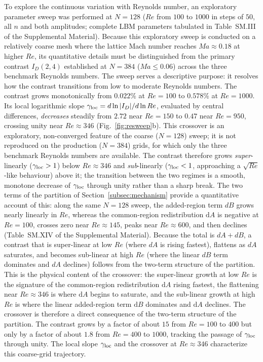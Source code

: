 To explore the continuous variation with Reynolds number, an exploratory parameter sweep was performed at $N=128$ ($Re$ from $100$ to $1000$ in steps of $50$, all $n$ and both amplitudes; complete LBM parameters tabulated in Table~SM.III of the Supplemental Material). Because this exploratory sweep is conducted on a relatively coarse mesh where the lattice Mach number reaches $Ma\approx0.18$ at higher $Re$, its quantitative details must be distinguished from the primary contrast $I_D(2,4)$ established at $N=384$ ($Ma\le0.06$) across the three benchmark Reynolds numbers. The sweep serves a descriptive purpose: it resolves how the contrast transitions from low to moderate Reynolds numbers. The contrast grows monotonically from $0.022\%$ at $Re=100$ to $0.578\%$ at $Re=1000$. Its local logarithmic slope $\gamma_{\rm loc}=d\ln|I_D|/d\ln Re$, evaluated by central differences, \emph{decreases} steadily from $2.72$ near $Re=150$ to $0.47$ near $Re=950$, crossing unity near $Re\approx346$ (Fig.~\ref{fig:resweep}b). This crossover is an exploratory, non-converged feature of the coarse ($N=128$) sweep; it is not reproduced on the production ($N=384$) grids, for which only the three benchmark Reynolds numbers are available. The contrast therefore grows \emph{super}-linearly ($\gamma_{\rm loc}>1$) below $Re\approx346$ and \emph{sub}-linearly ($\gamma_{\rm loc}<1$, approaching a $\sqrt{Re}$-like behaviour) above it; the transition between the two regimes is a smooth, monotone decrease of $\gamma_{\rm loc}$ through unity rather than a sharp break. The two terms of the partition of Section~\ref{subsec:mechanism} provide a quantitative account of this: along the same $N=128$ sweep, the added-region term $dB$ grows nearly linearly in $Re$, whereas the common-region redistribution $\mathrm{d}A$ is negative at $Re=100$, crosses zero near $Re\approx145$, peaks near $Re\approx600$, and then declines (Table~SM.XIV of the Supplemental Material). Because the total is $dA+dB$, a contrast that is super-linear at low $Re$ (where $dA$ is rising fastest), flattens as $dA$ saturates, and becomes sub-linear at high $Re$ (where the linear $dB$ term dominates and $dA$ declines) follows from the two-term structure of the partition. This is the physical content of the crossover: the super-linear growth at low $Re$ is the signature of the common-region redistribution $\mathrm{d}A$ rising fastest, the flattening near $Re\approx346$ is where $\mathrm{d}A$ begins to saturate, and the sub-linear growth at high $Re$ is where the linear added-region term $\mathrm{d}B$ dominates and $\mathrm{d}A$ declines. The crossover is therefore a direct consequence of the two-term structure of the partition. The contrast grows by a factor of about $15$ from $Re=100$ to $400$ but only by a factor of about $1.8$ from $Re=400$ to $1000$, tracking the passage of $\gamma_{\rm loc}$ through unity. The local slope $\gamma_{\rm loc}$ and the crossover at $Re\approx346$ characterize this coarse-grid trajectory.

